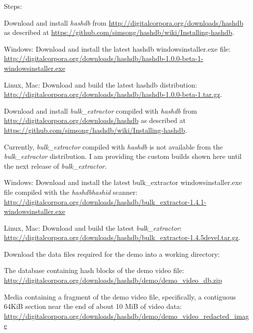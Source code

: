 \documentclass[12pt,twoside]{article}
\newcommand{\hdb}{\emph{hashdb}\xspace}
\newcommand{\bulk}{\emph{bulk\_extractor}\xspace}
\newcommand{\hashid}{\emph{hashid}\xspace}
\begin{document}
Steps:
\begin{compactenum}
\item Download and install \hdb from
\url{http://digitalcorpora.org/downloads/hashdb}
as described at
\url{https://github.com/simsong/hashdb/wiki/Installing-hashdb}.
  \begin{compactitem}
  \item Windows: Download and install the latest hashdb windowsinstaller.exe file:
  \url{http://digitalcorpora.org/downloads/hashdb/hashdb-1.0.0-beta-1-windowsinstaller.exe}
  \item Linux, Mac: Download and build the latest hashdb distribution:
  \url{http://digitalcorpora.org/downloads/hashdb/hashdb-1.0.0-beta-1.tar.gz}.
  \end{compactitem}
\item Download and install \bulk compiled with \hdb from
\url{http://digitalcorpora.org/downloads/hashdb}
as described at
\url{https://github.com/simsong/hashdb/wiki/Installing-hashdb}.

Currently, \bulk compiled with \hdb
is not available from the \bulk distribution.
I am providing the custom builds shown here until the next release of \bulk.
  \begin{compactitem}
  \item Windows: Download and install the latest
  bulk\_extractor windowsinstaller.exe file
  compiled with the \hdb \hashid scanner:
  \url{http://digitalcorpora.org/downloads/hashdb/bulk\_extractor-1.4.1-windowsinstaller.exe}
  \item Linux, Mac: Download and build the latest \bulk:
  \url{http://digitalcorpora.org/downloads/hashdb/bulk\_extractor-1.4.5devel.tar.gz}.
  \end{compactitem}

\item Download the data files required for the demo into a working directory:
  \begin{compactitem}
  \item The database containing hash blocks of the demo video file:
  \url{http://digitalcorpora.org/downloads/hashdb/demo/demo\_video\_db.zip}
  \item Media containing a fragment of the demo video file,
  specifically, a contiguous 64KiB section
  near the end of about 10 MiB of video data:
  \url{http://digitalcorpora.org/downloads/hashdb/demo/demo\_video\_redacted\_image}
  \end{compactitem}


\end{compactenum}
\end{document}
